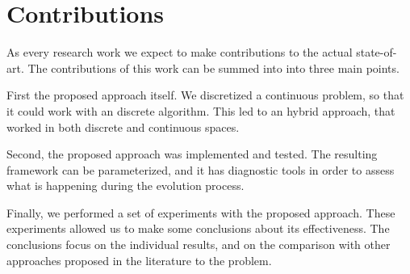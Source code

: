 \section{Contributions}

As every research work we expect to make contributions to the actual state-of-art. The contributions of this work can be summed into into three main points. 

First the proposed approach itself. We discretized a continuous problem, so that it could work with an discrete algorithm. This led to an hybrid approach, that worked in both discrete and continuous spaces.

Second, the proposed approach was implemented and tested. The resulting framework can be parameterized, and it has diagnostic tools in order to assess what is happening during the evolution process. 

Finally, we performed a set of experiments with the proposed approach. These experiments allowed us to make some conclusions about its effectiveness. The conclusions focus on the individual results, and on the comparison with other approaches proposed in the literature to the problem.



